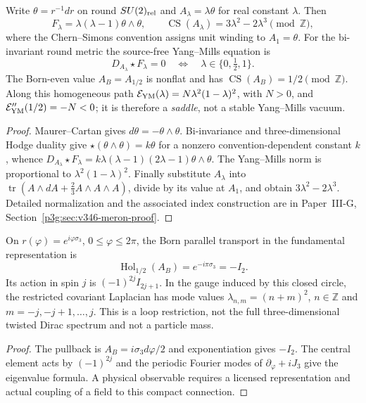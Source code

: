\documentclass[12pt,a4paper]{article}
\begin{document}
\begin{theorem}
\label{p3b:thm:v346-born-meron-ym}
Write $\theta=r^{-1}dr$ on round $SU(2)_{\rm rel}$ and
$A_\lambda=\lambda\theta$ for real constant $\lambda$.  Then
\[
 F_\lambda=\lambda(\lambda-1)\theta\wedge\theta,
 \qquad \operatorname{CS}(A_\lambda)
 =3\lambda^2-2\lambda^3\pmod{\mathbb Z},
\]
where the Chern--Simons convention assigns unit winding to $A_1=\theta$.
For the bi-invariant round metric the source-free Yang--Mills equation is
\[
 \boxed{D_{A_\lambda}\star F_\lambda=0
 \quad\Longleftrightarrow\quad
 \lambda\in\{0,\tfrac12,1\}.}
\]
The Born-even value $A_B=A_{1/2}$ is nonflat and has
$\operatorname{CS}(A_B)=1/2\pmod{\mathbb Z}$.  Along this homogeneous path
$\mathcal E_{\rm YM}(\lambda)=N\lambda^2(1-\lambda)^2$, with $N>0$,
and $\mathcal E_{\rm YM}''(1/2)=-N<0$; it is therefore a
\emph{saddle}, not a stable Yang--Mills vacuum.
\end{theorem}
\begin{proof}
Maurer--Cartan gives $d\theta=-\theta\wedge\theta$.
Bi-invariance and three-dimensional Hodge duality give
$\star(\theta\wedge\theta)=k\theta$ for a nonzero convention-dependent
constant $k$, whence
$D_{A_\lambda}\star F_\lambda
 =k\lambda(\lambda-1)(2\lambda-1)\theta\wedge\theta$.
The Yang--Mills norm is proportional to
$\lambda^2(1-\lambda)^2$.  Finally substitute $A_\lambda$ into
$\operatorname{tr}(A\wedge dA+\frac23 A\wedge A\wedge A)$, divide by its
value at $A_1$, and obtain $3\lambda^2-2\lambda^3$.
Detailed normalization and the associated index construction are in
Paper~III-G, Section~\ref{p3g:sec:v346-meron-proof}.
\end{proof}

\begin{corollary}
\label{p3b:cor:v346-born-meron-wilson}
On $r(\varphi)=e^{i\varphi\sigma_3}$,
$0\le\varphi\le2\pi$, the Born parallel transport in the fundamental
representation is
\[
 \boxed{\operatorname{Hol}_{1/2}(A_B)
 =e^{-i\pi\sigma_3}=-I_2.}
\]
Its action in spin $j$ is $(-1)^{2j}I_{2j+1}$.  In the gauge induced by
this closed circle, the restricted covariant Laplacian has mode values
$\lambda_{n,m}=(n+m)^2$, $n\in\mathbb Z$ and
$m=-j,-j+1,\ldots,j$.  This is a loop restriction, not the full
three-dimensional twisted Dirac spectrum and not a particle mass.
\end{corollary}
\begin{proof}
The pullback is $A_B=i\sigma_3 d\varphi/2$ and exponentiation gives
$-I_2$.  The central element acts by $(-1)^{2j}$ and the periodic
Fourier modes of $\partial_\varphi+iJ_3$ give the eigenvalue formula.
A physical observable requires a licensed representation and actual
coupling of a field to this compact connection.
\end{proof}
\end{document}
